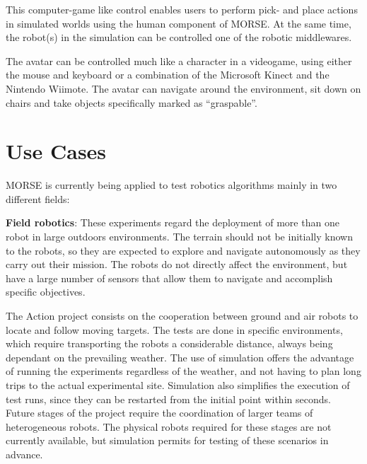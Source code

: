 \documentclass{llncs}
\begin{document}
This computer-game like control enables users to perform pick- and place actions in simulated worlds using the 
human component of MORSE. At the same time, the robot(s) in the simulation can be controlled one of the robotic middlewares. 

The avatar can be controlled much like a character in a videogame, using either the mouse and
keyboard or a combination of the Microsoft Kinect and the Nintendo Wiimote. The
avatar can navigate around the environment, sit down on chairs and take objects
specifically marked as ``graspable''.



\section{Use Cases}
\label{section:usecases}

MORSE is currently being applied to test robotics algorithms mainly in two
different fields:

\textbf{Field robotics}: These experiments regard the deployment of more than
one robot in large outdoors environments. The terrain should not be initially
known to the robots, so they are expected to explore and navigate autonomously
as they carry out their mission.
The robots do not directly affect the environment, but have a large number of
sensors that allow them to navigate and accomplish specific objectives.

The Action \cite{6106782} project consists on the cooperation between ground
and air robots to locate and follow moving targets. The tests are done in
specific environments, which require transporting the robots a considerable
distance, always being dependant on the prevailing weather.  The use of
simulation offers the advantage of running the experiments regardless of the
weather, and not having to plan long trips to the actual experimental site.
Simulation also simplifies the execution of test runs, since they can be
restarted from the initial point within seconds.  Future stages of the project
require the coordination of larger teams of heterogeneous robots. The physical
robots required for these stages are not currently available, but simulation
permits for testing of these scenarios in advance.
\end{document}
